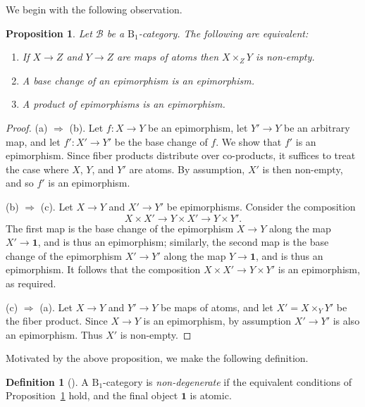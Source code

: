 \documentclass[12pt]{amsart}
\numberwithin{equation}{section}
\newtheorem{proposition}[equation]{Proposition}
\theoremstyle{definition}
\newtheorem{defnaux}[equation]{Definition}
\newenvironment{definition}[1][]{\begin{defnaux}[#1]\pushQED{\qed}}{\popQED \end{defnaux}}
\newcommand{\cB}{\mathcal{B}}
\newcommand{\rB}{\mathrm{B}}
\newcommand{\defn}[1]{\emph{#1}}
\newcommand{\bone}{\mathbf{1}}
\begin{document}
We begin with the following observation.

\begin{proposition} \label{prop:nondegen}
Let $\cB$ be a $\rB_1$-category. The following are equivalent:
\begin{enumerate}
\item If $X \to Z$ and $Y \to Z$ are maps of atoms then $X \times_Z Y$ is non-empty.
\item A base change of an epimorphism is an epimorphism.
\item A product of epimorphisms is an epimorphism.
\end{enumerate}
\end{proposition}

\begin{proof}
(a) $\Rightarrow$ (b). Let $f \colon X \to Y$ be an epimorphism, let $Y' \to Y$ be an arbitrary map, and let $f' \colon X' \to Y'$ be the base change of $f$. We show that $f'$ is an epimorphism. Since fiber products distribute over co-products, it suffices to treat the case where $X$, $Y$, and $Y'$ are atoms. By assumption, $X'$ is then non-empty, and so $f'$ is an epimorphism.

(b) $\Rightarrow$ (c). Let $X \to Y$ and $X' \to Y'$ be epimorphisms. Consider the composition
\begin{displaymath}
X \times X' \to Y \times X' \to Y \times Y'.
\end{displaymath}
The first map is the base change of the epimorphism $X \to Y$ along the map $X' \to \bone$, and is thus an epimorphism; similarly, the second map is the base change of the epimorphism $X' \to Y'$ along the map $Y \to \bone$, and is thus an epimorphism. It follows that the composition $X \times X' \to Y \times Y'$ is an epimorphism, as required.

(c) $\Rightarrow$ (a). Let $X \to Y$ and $Y' \to Y$ be maps of atoms, and let $X'=X \times_Y Y'$ be the fiber product. Since $X \to Y$ is an epimorphism, by assumption $X' \to Y'$ is also an epimorphism. Thus $X'$ is non-empty.
\end{proof}

Motivated by the above proposition, we make the following definition.

\begin{definition} \label{defn:non-degen}
A $\rB_1$-category is \defn{non-degenerate} if the equivalent conditions of Proposition~\ref{prop:nondegen} hold, and the final object $\bone$ is atomic.
\end{definition}
\end{document}
